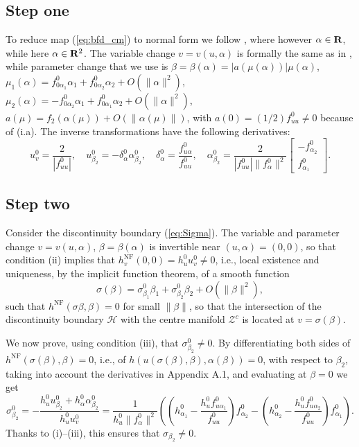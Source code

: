 \documentclass[final,onefignum]{siamltex}
\begin{document}
\subsection{Step one}
To reduce map (\ref{eq:bfd_cm}) to normal form we follow \citep{Kuznetsov04}, where however $\alpha\in{{\bf R}}$, while here $\alpha\in{{\bf R}}^2$.  The variable change $v=v(u,\alpha)$ is formally the same as in \citep{Kuznetsov04}, while  parameter change that we use is $\beta = \beta(\alpha)=|a(\mu(\alpha))|\mu(\alpha)$, $\mu_1(\alpha) = f_{0\alpha_1}^0\alpha_1+f_{0\alpha_2}^0\alpha_2+O(\|\alpha\|^2)$, $\mu_2(\alpha) = -f_{0\alpha_2}^0\alpha_1+f_{0\alpha_1}^0\alpha_2+O(\|\alpha\|^2)$, $a(\mu)=f_2(\alpha(\mu))+O(\|\alpha(\mu)\|)$,
with $a(0)=(1/2)f_{uu}^0\neq 0$ because of (i.a).  The inverse transformations have the following derivatives:
$$
u_{v}^0={\displaystyle \frac{\displaystyle {2}}{\displaystyle {|f_{uu}^0|}}},\quad
u_{\beta_2}^0=-\delta_{\alpha}^0\alpha_{\beta_2}^0,\quad
\delta_{\alpha}^0={\displaystyle \frac{\displaystyle {f_{u\alpha}^0}}{\displaystyle {f_{uu}^0}}},\quad
\alpha_{\beta_2}^0={\displaystyle \frac{\displaystyle {2}}{\displaystyle {|f_{uu}^0|\|f_{\alpha}^0\|^2}}}
\left[\begin{array}{c}
-f_{\alpha_2}^0\\
 f_{\alpha_1}^0
\end{array}\right].
$$

\subsection{Step two}
Consider the discontinuity boundary (\ref{eq:Sigma}).  The variable and parameter change $v=v(u,\alpha)$, $\beta=\beta(\alpha)$ is invertible near $(u,\alpha)=(0,0)$, so that condition (ii) implies that $h^{\mathrm{NF}}_v(0,0)=h_u^0 u_v^0\neq 0$, i.e., local existence and uniqueness, by the implicit function theorem, of a smooth function
$$
\sigma(\beta)=\sigma_{\beta_1}^0\beta_1+\sigma_{\beta_2}^0\beta_2+
O(\|\beta\|^2),
$$
such that $h^{\mathrm{NF}}(\sigma{\beta},\beta)=0$ for small $\|\beta\|$, so that the intersection of the discontinuity boundary $\mathcal{H}$ with the centre manifold $\mathcal{Z}^c$ is located at $v=\sigma(\beta)$.

We now prove, using condition (iii), that $\sigma_{\beta_2}^0\neq0$.  By differentiating both sides of $h^{\mathrm{NF}}(\sigma(\beta),\beta)=0$, i.e., of $h(u(\sigma(\beta),\beta),\alpha(\beta))=0$,
with respect to $\beta_2$, taking into account the derivatives in Appendix A.1, and evaluating at $\beta=0$ we get
$$
\sigma_{\beta_2}^0=
-{\displaystyle \frac{\displaystyle {h_u^0 u_{\beta_2}^0+h_{\alpha}^0\alpha_{\beta_2}^0}}{\displaystyle {h_u^0 u_{v}^0}}}=
{\displaystyle \frac{\displaystyle {1}}{\displaystyle {h_u^0\|f_{\alpha}^0\|^2}}}\left(
\left(h_{\alpha_1}^0-{\displaystyle \frac{\displaystyle {h_u^0f_{u\alpha_1}^0}}{\displaystyle {f_{uu}^0}}}\right)
f_{\alpha_2}^0-
\left(h_{\alpha_2}^0-{\displaystyle \frac{\displaystyle {h_u^0f_{u\alpha_2}^0}}{\displaystyle {f_{uu}^0}}}\right)
f_{\alpha_1}^0
\right).
$$
Thanks to (i)--(iii), this ensures that $\sigma_{\beta_2}\neq 0$.
\end{document}
